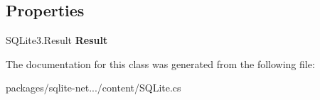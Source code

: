 \subsection*{Properties}
\begin{DoxyCompactItemize}
\item 
\hypertarget{classSQLite_1_1SQLiteException_afac5e8638f0b4e70588537f2470f1b3c}{S\-Q\-Lite3.\-Result {\bfseries Result}}\label{classSQLite_1_1SQLiteException_afac5e8638f0b4e70588537f2470f1b3c}

\end{DoxyCompactItemize}


The documentation for this class was generated from the following file\-:\begin{DoxyCompactItemize}
\item 
packages/sqlite-\/net.../content/S\-Q\-Lite.\-cs\end{DoxyCompactItemize}
